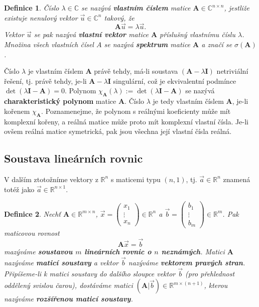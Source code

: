 \documentclass{article}
\newtheorem{df}{Definice}
\newcommand{\0}{\vec{0}}
\newcommand{\A}{\mat A}
\newcommand{\C}{\mathbb C}
\newcommand{\I}{\mat I}
\newcommand{\mat}[1]{\mathbf{#1}}
\newcommand{\R}{\mathbb R}
\newcommand{\uu}{\vec{u}}
\newcommand{\xx}{\vec{x}}
\begin{document}
\begin{df}
Číslo $\lambda\in\C$ se nazývá {\bf vlastním číslem} matice $\A\in\C^{n\times n}$, jestliže existuje nenulový vektor $\uu\in\C^n$ takový, že
$$ \A\uu=\lambda\uu. $$
Vektor $\uu$ se pak nazývá {\bf vlastní vektor} matice $\A$ příslušný vlastnímu číslu $\lambda$.
Množina všech vlastních čísel $A$ se nazývá {\bf spektrum} matice $\A$ a značí se $\sigma(\A)$.
\end{df}
Číslo $\lambda$ je vlastním číslem $\A$ právě tehdy, má-li soustava $(\A-\lambda\I)$ netriviální řešení, tj. právě tehdy, je-li $\A-\lambda\I$ singulární, což je ekvivalentní podmínce $\det(\lambda\I-\A)=0$.
Polynom $\chi_\A(\lambda):=\det(\lambda\I-\A)$ se nazývá {\bf charakteristický polynom} matice $\A$.
Číslo $\lambda$ je tedy vlastním číslem $\A$, je-li kořenem $\chi_\A$.
Poznamenejme, že polynom s reálnými koeficienty může mít komplexní kořeny, a reálná matice může proto mít komplexní vlastní čísla.
Je-li ovšem reálná matice symetrická, pak jsou všechna její vlastní čísla reálná.






\subsection{Soustava lineárních rovnic}

V dalším ztotožníme vektory z $\R^n$ s maticemi typu $(n,1)$, tj. $\vec a\in\R^n$ znamená totéž jako $\vec a\in\R^{n\times 1}$.

\begin{df}
Nechť $\A\in\R^{m\times n}$, $\xx=\begin{pmatrix}x_1\\\vdots\\x_n\end{pmatrix}\in\R^{n}$ a $\vec b=\begin{pmatrix}b_1\\\vdots\\b_m\end{pmatrix}\in\R^{m}$.
Pak maticovou rovnost
$$ \A\xx=\vec b $$
mazýváme {\bf soustavou $m$ lineárních rovnic o $n$ neznámých}.
Matici $\A$ nazýváme {\bf maticí soustavy} a vektor $\vec b$ nazýváme {\bf vektorem pravých stran}.
Připíšeme-li k matici soustavy do dalšího sloupce vektor $\vec b$ (pro přehlednost oddělený svislou čarou), dostáváme matici $(\A|\vec b)\in\R^{m\times(n+1)}$, kterou nazýváme {\bf rozšířenou maticí soustavy}.
\end{df}
\end{document}
